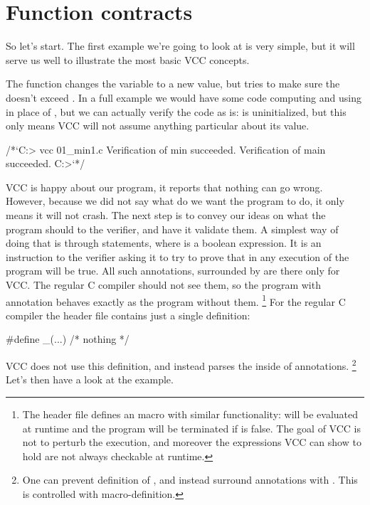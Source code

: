 \section{Function contracts}

So let's start.
The first example we're going to look at is very simple, but it will serve
us well to illustrate the most basic VCC concepts.


\noindent
The  function changes the variable  to a new
value, but tries to make sure the  doesn't exceed .
In a full example we would have some code computing 
and using  in place of , but we can actually
verify the code as is:  is uninitialized,
but this only means
VCC will not assume anything particular about its value.

\begin{VCC}
/*`C:\somewhere> vcc 01_min1.c
Verification of min succeeded.
Verification of main succeeded.
C:\somewhere>`*/
\end{VCC}

\noindent
VCC is happy about our program, it reports that nothing can go wrong.
However, because we did not say what do we want the program to do,
it only means it will not crash.
The next step is to convey our ideas on what the program should
to the verifier, and have it validate them.
A simplest way of doing that is through 
statements, where  is a boolean expression.
It is an instruction to the verifier asking it to try to prove
that in any execution of the program  will be true.
All such annotations, surrounded by 
are there only for VCC.
The regular C compiler should not see them,
so the program with annotation behaves exactly as the program
without them.
\footnote{
  The  header file defines an 
  macro with similar functionality:  will be evaluated
  at runtime and the program will be terminated if  is false.
  The goal of VCC is not to perturb the execution,
  and moreover the expressions VCC can show to hold are not always
  checkable at runtime.
}
For the regular C compiler the  header file contains
just a single definition:
\begin{VCC}
#define _(...) /* nothing */
\end{VCC}
VCC does not use this definition, and instead parses the inside of 
annotations.%
\footnote{
  One can prevent definition of \vcc{_}, and instead surround annotations with
  .
  This is controlled with  macro-definition.}
Let's then have a look at the example.

